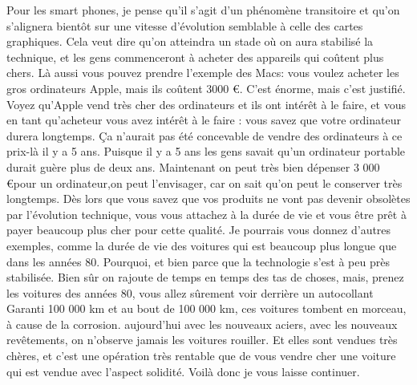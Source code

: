 \begin{small}
Pour les smart phones, je pense  qu'il s'agit d'un phénomène transitoire et qu'on s'alignera bientôt sur une vitesse d'évolution semblable à celle des cartes graphiques. Cela veut dire qu'on atteindra un stade où on aura stabilisé la technique, et les gens commenceront à acheter des appareils qui coûtent plus chers. Là aussi vous pouvez prendre l'exemple des Macs: vous voulez acheter les gros ordinateurs Apple, mais ils coûtent 3000 \euro. C'est énorme, mais c'est justifié. Voyez qu'Apple vend très cher des ordinateurs et ils ont intérêt à le faire, et vous en tant qu'acheteur vous avez intérêt à le faire : vous savez que votre ordinateur durera longtemps. Ça n'aurait pas été concevable de vendre des ordinateurs à ce prix-là il y a 5 ans. Puisque il y a 5 ans les gens savait qu'un ordinateur portable durait guère plus de deux ans. Maintenant on peut très bien dépenser 3 000 \euro pour un ordinateur,on peut l'envisager, car on sait qu'on peut le conserver très longtemps. Dès lors que vous savez que vos produits ne vont pas devenir obsolètes par l'évolution technique, vous vous attachez à la durée de vie et vous être prêt à payer beaucoup plus cher pour cette qualité. 
Je pourrais vous donnez d'autres exemples, comme la durée de vie des voitures qui est beaucoup plus longue que dans les années 80. Pourquoi, et bien parce que la technologie s'est à peu près stabilisée. Bien sûr on rajoute de temps en temps des tas de choses, mais, prenez les voitures des années 80, vous allez sûrement voir derrière un autocollant \og Garanti 100 000 km\fg{} et au bout de 100 000 km, ces voitures tombent en morceau, à cause de la corrosion. aujourd'hui avec les nouveaux aciers, avec les nouveaux revêtements, on n'observe jamais les voitures rouiller. Et elles sont vendues très chères, et c'est une opération très rentable que de vous vendre cher une voiture qui est vendue avec l'aspect solidité.
Voilà donc je vous laisse continuer.






\end{small}
